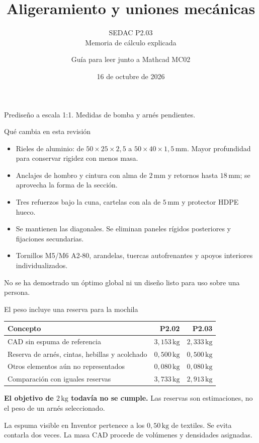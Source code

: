 \documentclass[10pt,aspectratio=169]{beamer}
\title{Aligeramiento y uniones mecánicas}
\subtitle{SEDAC P2.03\\Memoria de cálculo explicada}
\author{Guía para leer junto a Mathcad MC02}
\date{16 de octubre de 2026}
\newcommand{\mm}{\,\mathrm{mm}}
\newcommand{\kg}{\,\mathrm{kg}}
\newcommand{\mcref}{Guía de diseño}
\begin{document}
\spanishplainpercent
\begin{frame}
\titlepage
\vspace{-6mm}\begin{center}\small Prediseño a escala 1:1. Medidas de bomba y arnés pendientes.\end{center}
\end{frame}
\gdef\mcref{Guía de diseño}
\begin{frame}[t]{Qué cambia en esta revisión}

\begin{itemize}
\item Rieles de aluminio: de $50\times25\times2{,}5$ a $50\times40\times1{,}5\mm$. Mayor profundidad para conservar rigidez con menos masa.
\item Anclajes de hombro y cintura con alma de $2\mm$ y retornos hasta $18\mm$; se aprovecha la forma de la sección.
\item Tres refuerzos bajo la cuna, cartelas con ala de $5\mm$ y protector HDPE hueco.
\item Se mantienen las diagonales. Se eliminan paneles rígidos posteriores y fijaciones secundarias.
\item Tornillos M5/M6 A2-80, arandelas, tuercas autofrenantes y apoyos interiores individualizados.
\end{itemize}
No se ha demostrado un óptimo global ni un diseño listo para uso sobre una persona.

\end{frame}

\gdef\mcref{Mathcad: sección 25 / pág. 43}
\begin{frame}[t]{El peso incluye una reserva para la mochila}

\begin{center}\begin{tabular}{lrr}\toprule
Concepto & P2.02 & P2.03\\\midrule
CAD sin espuma de referencia & $3{,}153\kg$ & $2{,}333\kg$\\
Reserva de arnés, cintas, hebillas y acolchado & $0{,}500\kg$ & $0{,}500\kg$\\
Otros elementos aún no representados & $0{,}080\kg$ & $0{,}080\kg$\\\midrule
Comparación con iguales reservas & $3{,}733\kg$ & $2{,}913\kg$\\\bottomrule
\end{tabular}\end{center}
\textbf{El objetivo de $2\kg$ todavía no se cumple.} Las reservas son estimaciones, no el peso de un arnés seleccionado.

La espuma visible en Inventor pertenece a los $0{,}50\kg$ de textiles. Se evita contarla dos veces. La masa CAD procede de volúmenes y densidades asignadas.

\end{frame}
\end{document}
